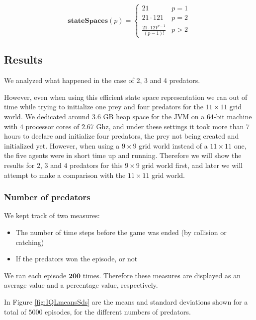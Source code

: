 \[
\mathbf{stateSpaces}(p) = 
\begin{cases}
	21 & p = 1\\
    21 \cdot 121 & p = 2 \\
    \frac{21\cdot 121^{p-1}}{(p-1)!}& p > 2
\end{cases}
\]


\subsection{Results}

We analyzed what happened in the case of 2, 3 and 4 predators.

However, even when using this efficient state space representation we ran out of time while trying to initialize one prey and four predators for the $11 \times 11$ grid world. We dedicated around $3.6$ GB heap space for the JVM on a $64$-bit machine with $4$ processor cores of $2.67$ Ghz, and under these settings it took more than $7$ hours to declare and initialize four predators, the prey not being created and initialized yet.
However, when using a $9 \times 9$ grid world instead of a $11 \times 11$ one, the five agents were in short time up and running. 
Therefore we will show the results for $2$, $3$ and $4$ predators for this $9 \times 9$
 grid world first, and later we will attempt to make a comparison with the $11 \times 11$ grid world.



\subsubsection{Number of predators}\label{sec:IQLresults1}
We kept track of two measures:
\begin{itemize}
\item The number of time steps before the game was ended (by collision or catching)
\item If the predators won the episode, or not 
\end{itemize}
We ran each episode $\mathbf{200}$ times. Therefore these measures are displayed as an average value and a percentage value, respectively.

In Figure \ref{fig:IQLmeansSds} are the means and standard deviations shown for a total of $5000$ episodes, for the different numbers of predators.

